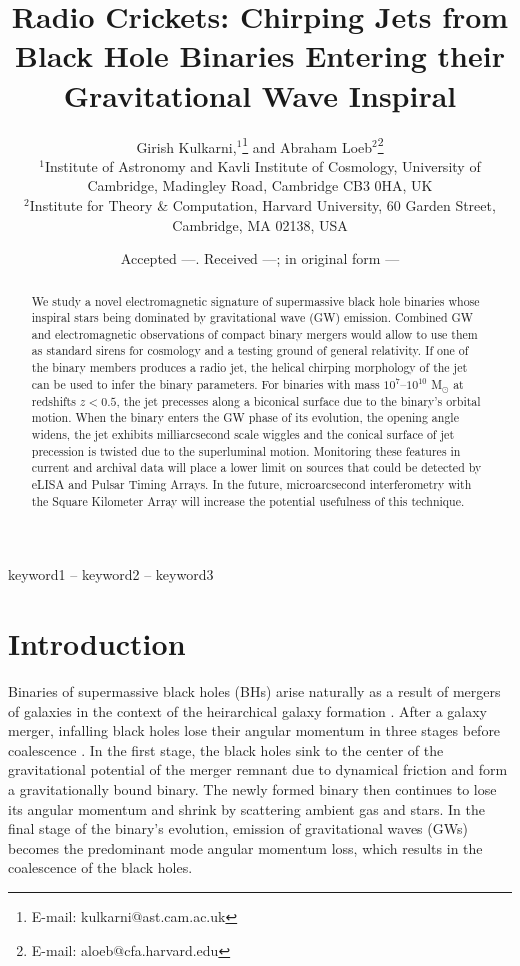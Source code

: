 \documentclass[a4paper,fleqn,usenatbib]{mnras}
\title[Chirping Jets from Black Hole Binaries]{Radio Crickets:
  Chirping Jets from Black Hole Binaries Entering their Gravitational
  Wave Inspiral}
\author[Kulkarni and Loeb]{
Girish Kulkarni,$^{1}$\thanks{E-mail: kulkarni@ast.cam.ac.uk}
and Abraham Loeb$^{2}$\thanks{E-mail: aloeb@cfa.harvard.edu}
\\
$^{1}$Institute of Astronomy and Kavli
  Institute of Cosmology, University of Cambridge, Madingley Road,
  Cambridge CB3 0HA, UK\\ 
$^{2}$Institute for Theory \& Computation,
  Harvard University, 60 Garden Street, Cambridge, MA 02138, USA\\ 
}
\date{Accepted ---. Received ---; in original form ---}
\begin{document}
\label{firstpage}
\pagerange{\pageref{firstpage}--\pageref{lastpage}}
\maketitle

\begin{abstract}
  We study a novel electromagnetic signature of supermassive black
  hole binaries whose inspiral stars being dominated by gravitational
  wave (GW) emission. Combined GW and electromagnetic observations of
  compact binary mergers would allow to use them as standard sirens
  for cosmology and a testing ground of general relativity.  If one of
  the binary members produces a radio jet, the helical chirping
  morphology of the jet can be used to infer the binary parameters.
  For binaries with mass $10^7$--$10^{10}$ M$_\odot$ at redshifts
  $z<0.5$, the jet precesses along a biconical surface due to the
  binary's orbital motion.  When the binary enters the GW phase of its
  evolution, the opening angle widens, the jet exhibits milliarcsecond
  scale wiggles and the conical surface of jet precession is twisted
  due to the superluminal motion.  Monitoring these features in
  current and archival data will place a lower limit on sources that
  could be detected by eLISA and Pulsar Timing Arrays.  In the future,
  microarcsecond interferometry with the Square Kilometer Array will
  increase the potential usefulness of this technique.
\end{abstract}

\begin{keywords}
keyword1 -- keyword2 -- keyword3
\end{keywords}



\section{Introduction}
\label{sec:intro}

Binaries of supermassive black holes (BHs) arise naturally as a result
of mergers of galaxies in the context of the heirarchical galaxy
formation \citep{2000MNRAS.311..576K, 2002MNRAS.336L..61H,
  2008ApJ...676...33D, 2012MNRAS.422.1306K}.  After a galaxy merger,
infalling black holes lose their angular momentum in three stages
before coalescence \citep{1980Natur.287..307B, 2005LRR.....8....8M,
  2011ASL.....4..181C}.  In the first stage, the black holes sink to
the center of the gravitational potential of the merger remnant due to
dynamical friction and form a gravitationally bound binary.  The newly
formed binary then continues to lose its angular momentum and shrink
by scattering ambient gas and stars.  In the final stage of the
binary's evolution, emission of gravitational waves (GWs) becomes the
predominant mode angular momentum loss, which results in the
coalescence of the black holes.
\end{document}
